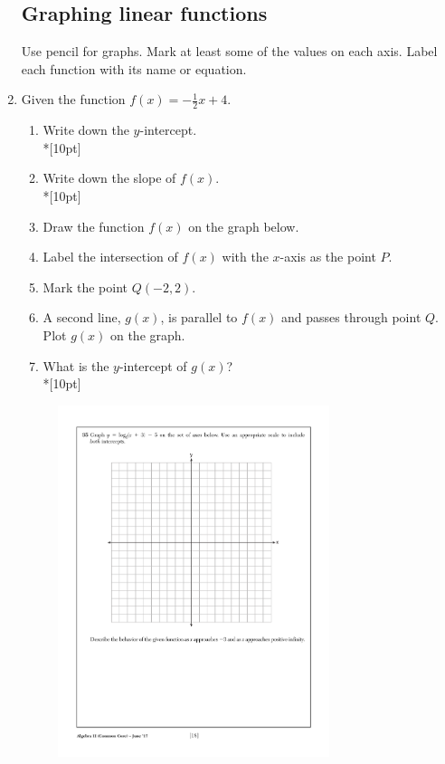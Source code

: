 \documentclass[]{book}
\begin{document}
\begin{enumerate}
\newpage
\subsection*{Graphing linear functions}
Use pencil for graphs. Mark at least some of the values on each axis. Label each function with its name or equation. 
\item Given the function $f(x)=-\frac{1}{2}x+4$. 
\begin{enumerate}
    \item Write down the $y$-intercept.\\*[10pt]
    \item Write down the slope of $f(x)$.\\*[10pt]
    \item Draw the function $f(x)$ on the graph below.
    \item Label the intersection of $f(x)$ with the $x$-axis as the point $P$.
    \item Mark the point $Q (-2, 2)$.
    \item A second line, $g(x)$, is parallel to $f(x)$ and passes through point $Q$. Plot $g(x)$ on the graph.
    \item What is the $y$-intercept of $g(x)$?\\*[10pt]
\end{enumerate}

\begin{figure}[!ht]
    \centering
    \includegraphics[width=0.75\textwidth]{regents-grid.pdf}
\end{figure}


\end{enumerate}
\end{document}
